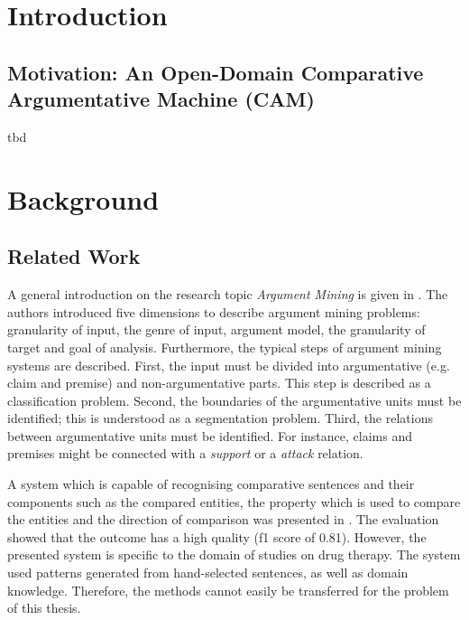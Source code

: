 \chapter{Introduction}

\section{Motivation: An Open-Domain Comparative Argumentative Machine (CAM)}

tbd


\chapter{Background}
\section{Related Work}
\label{sec:argth}
\label{sec:argmine}
A general introduction on the research topic \emph{Argument Mining} is given in \cite{Lippi2016Argumentation-M}.
 The authors introduced five dimensions to describe argument mining problems: granularity of input, the genre of input, argument model, the granularity of target and goal of analysis.  Furthermore, the typical steps of argument mining systems are described. First, the input must be divided into argumentative (e.g. claim and premise) and non-argumentative parts. This step is described as a classification problem. Second, the boundaries of the argumentative units must be identified; this is understood as a segmentation problem. Third, the relations between argumentative units must be identified. For instance, claims and premises might be connected with a \emph{support} or a \emph{attack} relation.




A system which is capable of recognising comparative sentences and their components such as the compared entities, the property which is used to compare the entities and the direction of comparison was presented in \cite{fiszman2007interpreting}. The evaluation showed that the outcome has a high quality (f1 score of 0.81). However, the presented system is specific to the domain of studies on drug therapy. The system used patterns generated from hand-selected sentences, as well as domain knowledge. Therefore, the methods cannot easily be transferred for the problem of this thesis.

